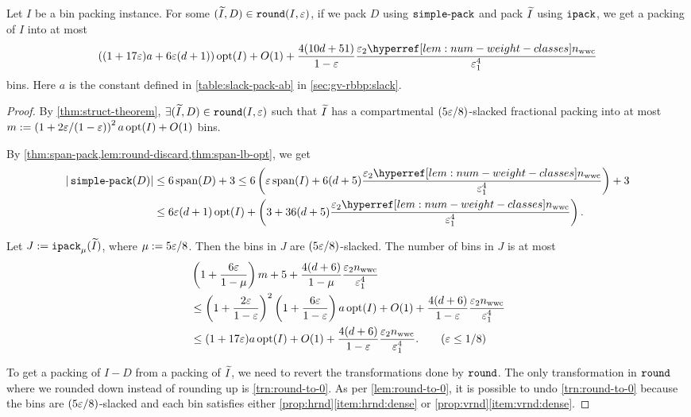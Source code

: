 \begin{theorem}
\label{thm:ipack-simple-approx}
Let $I$ be a  bin packing instance.
For some $(\widetilde{I}, D) \in \operatorname{\mathtt{round}}(I, \varepsilon)$, if we pack $D$ using $\operatorname{\mathtt{simple-pack}}$
and pack $\widetilde{I}$ using $\operatorname{\mathtt{ipack}}$, we get a packing of $I$ into at most
\[ \left((1 + 17\eps)a + 6\eps(d+1)\right)\opt(I) + O(1)
+ \frac{4(10d+51)}{1-\eps} \frac{\epsSmall\nwwcHyp}{\epsLarge^4} \]
bins. Here $a$ is the constant defined in \cref{table:slack-pack-ab}
in \cref{sec:gv-rbbp:slack}.
\end{theorem}
\begin{proof}
By \cref{thm:struct-theorem}, $\exists (\widetilde{I}, D) \in \operatorname{\mathtt{round}}(I, \varepsilon)$ such that
$\widetilde{I}$ has a compartmental $(5\varepsilon/8)$-slacked fractional packing into at most
$m := \left( 1 + 2\varepsilon/(1-\varepsilon) \right)^2 a\operatorname{opt}(I) + O(1)$ bins.

By \cref{thm:span-pack,lem:round-discard,thm:span-lb-opt}, we get
\begin{align*}
|\simplePack(D)| &\le 6\Span(D) + 3
\le 6\left(\eps\Span(I) + 6(d+5)\frac{\epsSmall\nwwcHyp}{\epsLarge^4}\right) + 3
\\ &\le 6\eps(d+1)\opt(I) + \left(3 + 36(d+5)\frac{\epsSmall\nwwcHyp}{\epsLarge^4}\right).
\end{align*}

Let $J := \operatorname{\mathtt{ipack}}_{\mu}(\widetilde{I})$, where $\mu := 5\varepsilon/8$.
Then the bins in $J$ are $(5\varepsilon/8)$-slacked. The number of bins in $J$ is at most
\begin{align*}
& \left( 1 + \frac{6\eps}{1-\mu}\right)m + 5
    + \frac{4(d+6)}{1-\mu} \frac{\epsSmall n_{\wwc}}{\epsLarge^4}
\\ &\le \left(1 + \frac{2\eps}{1-\eps}\right)^2\left(1 + \frac{6\eps}{1-\eps}\right)a\opt(I)
    + O(1) + \frac{4(d+6)}{1-\eps} \frac{\epsSmall n_{\wwc}}{\epsLarge^4}
\\ &\le (1 + 17\eps)a\opt(I)
    + O(1) + \frac{4(d+6)}{1-\eps} \frac{\epsSmall n_{\wwc}}{\epsLarge^4}.
\tag{$\eps \le 1/8$}
\end{align*}

To get a packing of $I-D$ from a packing of $\widetilde{I}$, we need to revert
the transformations done by $\operatorname{\mathtt{round}}$. The only transformation in $\operatorname{\mathtt{round}}$ where we
rounded down instead of rounding up is \cref{trn:round-to-0}.
As per \cref{lem:round-to-0}, it is possible to undo \cref{trn:round-to-0}
because the bins are $(5\varepsilon/8)$-slacked and each bin satisfies either
\cref{prop:hrnd}\ref{item:hrnd:dense} or \cref{prop:vrnd}\ref{item:vrnd:dense}.
\end{proof}

